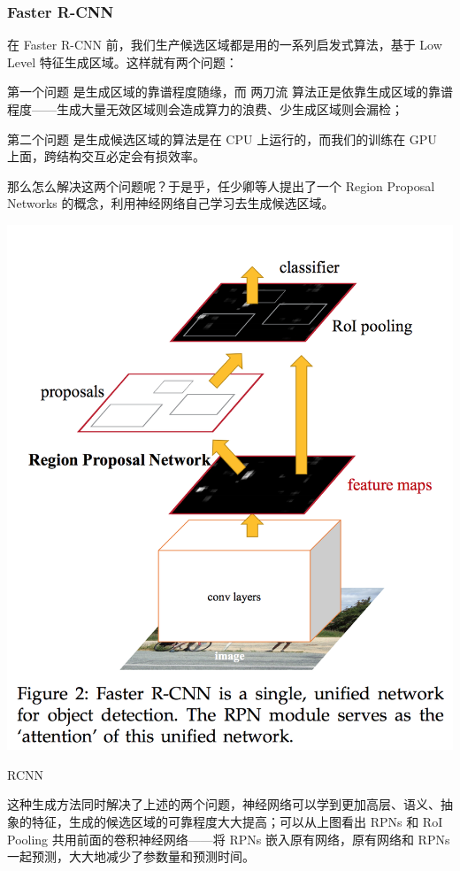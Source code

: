 \subsubsection{Faster R-CNN}
在 Faster R-CNN 前，我们生产候选区域都是用的一系列启发式算法，基于 Low Level 特征生成区域。这样就有两个问题：

第一个问题 是生成区域的靠谱程度随缘，而 两刀流 算法正是依靠生成区域的靠谱程度——生成大量无效区域则会造成算力的浪费、少生成区域则会漏检；

第二个问题 是生成候选区域的算法是在 CPU 上运行的，而我们的训练在 GPU 上面，跨结构交互必定会有损效率。

那么怎么解决这两个问题呢？于是乎，任少卿等人提出了一个 Region Proposal Networks 的概念，利用神经网络自己学习去生成候选区域。
\begin{uscfigure}
	\includegraphics[width=\textwidth]{./Pictures/faster_rcnn.png}	
	\caption{RCNN}	
\end{uscfigure}
这种生成方法同时解决了上述的两个问题，神经网络可以学到更加高层、语义、抽象的特征，生成的候选区域的可靠程度大大提高；可以从上图看出 RPNs 和 RoI Pooling 共用前面的卷积神经网络——将 RPNs 嵌入原有网络，原有网络和 RPNs 一起预测，大大地减少了参数量和预测时间。

